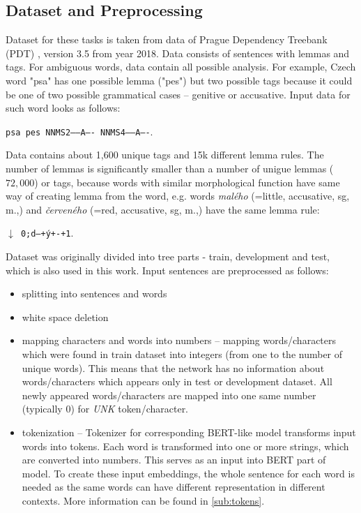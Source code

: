 \subsection{Dataset and Preprocessing}
\label{sub:dataset}
Dataset for these tasks is taken from data of Prague Dependency Treebank (PDT) \citep{PDT35}, version 3.5 from year 2018. Data consists of sentences with lemmas and tags. For ambiguous words, data contain all possible analysis. For example, Czech word "psa" has one possible lemma ("pes") but two possible tags because it could be one of two possible grammatical cases -- genitive or accusative. Input data for such word looks as follows: \\
\begin{center}
\texttt{psa pes NNMS2-----A---- NNMS4-----A----}.
\end{center}
Data contains about 1,600 unique tags and 15k different lemma rules. The number of lemmas is significantly smaller than a number of unigue lemmas ($72,000$) \citep{Strakova} or tags, because words with similar morphological function have same way of creating lemma from the word, e.g. words \textit{malého} (=little, accusative,  sg, m.,) and \textit{červeného}  (=red, accusative,  sg, m.,) have the same lemma rule:
\begin{center}
\texttt{$\downarrow$ 0;d\textbrokenbar ---+ý+-+1}.
\end{center} 
\par
Dataset was originally divided into tree parts - train, development and test, which is also used in this work. Input sentences are preprocessed as follows:
\begin{itemize}
\item splitting into sentences and words
\item white space deletion
\item mapping characters and words into numbers -- mapping  words/characters which were found in train dataset into integers (from one to the number of unique words). This means that the network has no information about words/characters which appears only in test or development dataset. All newly appeared words/characters are mapped into one same number (typically $0$) for \textit{UNK} token/character.
\item tokenization -- Tokenizer for corresponding BERT-like model transforms input words into tokens. Each word is transformed into one or more strings, which are converted into numbers. This serves as an input into BERT part of model. To create these input embeddings, the whole sentence for each word is needed as the same words can have different representation in different contexts. More information can be found in \ref{sub:tokens}.
\end{itemize}

